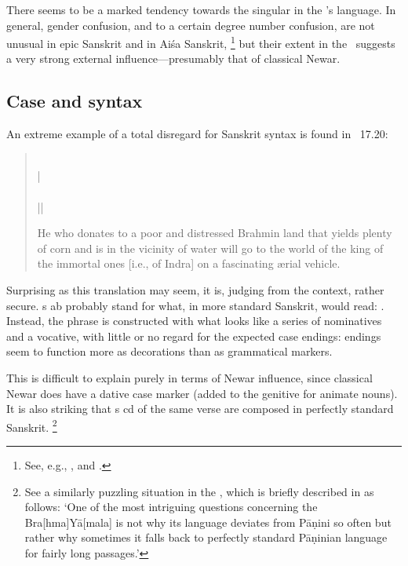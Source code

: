 There seems to be a marked tendency towards the singular in the \VSS's language. 
In general, gender confusion, and to a certain degree number confusion, are
not unusual in epic Sanskrit and in Aiśa Sanskrit,%
		\footnote{See, e.g., , and
                .}
but their extent in the \VSS\ suggests a very strong external influence---presumably
that of classical Newar.									





\subsection{Case and syntax}

An extreme example of a total disregard for Sanskrit syntax is found in \VSS~17.20:

\begin{quote}
\label{extremelanguage}
\\
 |\\
\\
 ||

He who donates to a poor and distressed Brahmin land that yields plenty of corn and is in the vicinity of water will go to the world of the king of the immortal ones [i.e., of Indra] on a fascinating \ae rial vehicle.
\end{quote}            
            
\noindent            
Surprising as this translation may seem, it is, judging from the context, rather secure. 
s ab probably stand for what, in more standard Sanskrit, would read:
.
Instead, the phrase is constructed with what looks like a series of nominatives and a
vocative, with little or no regard for the expected case endings: endings seem to function more
as decorations than as grammatical markers.

This is difficult to explain purely in terms of Newar influence, since classical Newar does have
a dative case marker (added to the genitive for animate nouns). 
It is also striking that s cd of the same verse are composed in perfectly standard Sanskrit.%
		\footnote{See a similarly puzzling situation in the \BraYa, 
                 which is briefly described in  as follows:
		`One of the most intriguing questions concerning the Bra[hma]Yā[mala] 
		is not why its language deviates from Pāṇini so often 
		but rather why sometimes it falls back to perfectly standard 
		Pāṇinian language for fairly long passages.'}

